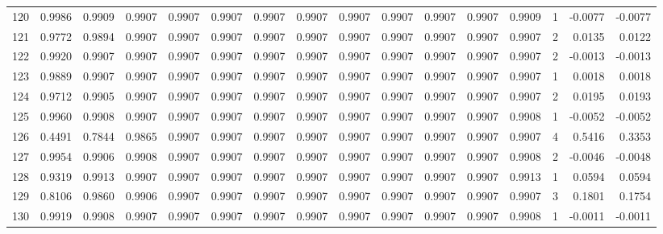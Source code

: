 \begin{tabular}{lrrrrrrrrrrrrrrr}
120 &      0.9986 &  0.9909 &  0.9907 &  0.9907 &  0.9907 &  0.9907 &  0.9907 &  0.9907 &  0.9907 &  0.9907 &   0.9907 &     0.9909 &      1 &                   -0.0077 &                    -0.0077 \\
121 &      0.9772 &  0.9894 &  0.9907 &  0.9907 &  0.9907 &  0.9907 &  0.9907 &  0.9907 &  0.9907 &  0.9907 &   0.9907 &     0.9907 &      2 &                    0.0135 &                     0.0122 \\
122 &      0.9920 &  0.9907 &  0.9907 &  0.9907 &  0.9907 &  0.9907 &  0.9907 &  0.9907 &  0.9907 &  0.9907 &   0.9907 &     0.9907 &      2 &                   -0.0013 &                    -0.0013 \\
123 &      0.9889 &  0.9907 &  0.9907 &  0.9907 &  0.9907 &  0.9907 &  0.9907 &  0.9907 &  0.9907 &  0.9907 &   0.9907 &     0.9907 &      1 &                    0.0018 &                     0.0018 \\
124 &      0.9712 &  0.9905 &  0.9907 &  0.9907 &  0.9907 &  0.9907 &  0.9907 &  0.9907 &  0.9907 &  0.9907 &   0.9907 &     0.9907 &      2 &                    0.0195 &                     0.0193 \\
125 &      0.9960 &  0.9908 &  0.9907 &  0.9907 &  0.9907 &  0.9907 &  0.9907 &  0.9907 &  0.9907 &  0.9907 &   0.9907 &     0.9908 &      1 &                   -0.0052 &                    -0.0052 \\
126 &      0.4491 &  0.7844 &  0.9865 &  0.9907 &  0.9907 &  0.9907 &  0.9907 &  0.9907 &  0.9907 &  0.9907 &   0.9907 &     0.9907 &      4 &                    0.5416 &                     0.3353 \\
127 &      0.9954 &  0.9906 &  0.9908 &  0.9907 &  0.9907 &  0.9907 &  0.9907 &  0.9907 &  0.9907 &  0.9907 &   0.9907 &     0.9908 &      2 &                   -0.0046 &                    -0.0048 \\
128 &      0.9319 &  0.9913 &  0.9907 &  0.9907 &  0.9907 &  0.9907 &  0.9907 &  0.9907 &  0.9907 &  0.9907 &   0.9907 &     0.9913 &      1 &                    0.0594 &                     0.0594 \\
129 &      0.8106 &  0.9860 &  0.9906 &  0.9907 &  0.9907 &  0.9907 &  0.9907 &  0.9907 &  0.9907 &  0.9907 &   0.9907 &     0.9907 &      3 &                    0.1801 &                     0.1754 \\
130 &      0.9919 &  0.9908 &  0.9907 &  0.9907 &  0.9907 &  0.9907 &  0.9907 &  0.9907 &  0.9907 &  0.9907 &   0.9907 &     0.9908 &      1 &                   -0.0011 &                    -0.0011 \\

\end{tabular}
